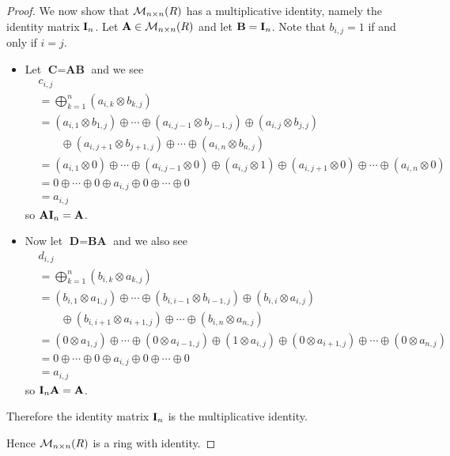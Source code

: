 \begin{proof}
    We now show that $\mathcal{M}_{n\times n}(R)$ has a multiplicative identity, namely the identity matrix $\textbf{I}_{n}$. Let $\textbf{A} \in \mathcal{M}_{n\times n}(R)$ and let $\textbf{B} = \textbf{I}_{n}$. Note that $b_{i,j} = 1$ if and only if $i = j$.
    \begin{itemize}
        \item Let $\textbf{C} = \textbf{AB}$ and we see
        \begin{align*}
            &c_{i,j}\\
            &= \bigoplus_{k=1}^n(a_{i,k}\otimes b_{k,j})\\
            &= (a_{i,1}\otimes b_{1,j}) \oplus \cdots \oplus (a_{i,j-1}\otimes b_{j-1,j}) \oplus (a_{i,j}\otimes b_{j,j})\\
            &\quad\quad\oplus (a_{i,{j+1}}\otimes b_{j+1,j}) \oplus \cdots \oplus (a_{i,n}\otimes b_{n,j})\\
            &= (a_{i,1}\otimes 0) \oplus \cdots \oplus (a_{i,{j-1}}\otimes 0)\oplus (a_{i,j}\otimes 1) \oplus (a_{i,{j+1}}\otimes 0) \oplus \cdots \oplus (a_{i,n}\otimes 0)\\
            &= 0 \oplus \cdots \oplus 0 \oplus a_{i,j} \oplus 0 \oplus \cdots \oplus 0\\
            &= a_{i,j}
        \end{align*}
        so $\textbf{A}\textbf{I}_{n} = \textbf{A}$.

        \item Now let $\textbf{D} = \textbf{BA}$ and we also see
        \begin{align*}
            &d_{i,j}\\
            &= \bigoplus_{k=1}^n(b_{i,k}\otimes a_{k,j})\\
            &= (b_{i,1}\otimes a_{1,j}) \oplus \cdots \oplus (b_{i,i-1}\otimes b_{i-1,j}) \oplus (b_{i,i}\otimes a_{i,j})\\
            &\quad\quad\oplus (b_{i,{i+1}}\otimes a_{i+1,j}) \oplus \cdots \oplus (b_{i,n}\otimes a_{n,j})\\
            &= (0 \otimes a_{1,j}) \oplus \cdots \oplus (0\otimes a_{i-1,j})\oplus (1\otimes a_{i,j}) \oplus (0\otimes a_{i+1,j}) \oplus \cdots \oplus (0\otimes a_{n,j})\\
            &= 0 \oplus \cdots \oplus 0 \oplus a_{i,j} \oplus 0 \oplus \cdots \oplus 0\\
            &= a_{i,j}
        \end{align*}
        so $\textbf{I}_{n}\textbf{A} = \textbf{A}$.
    \end{itemize}
    Therefore the identity matrix $\textbf{I}_{n}$ is the multiplicative identity.

    Hence $\mathcal{M}_{n\times n}(R)$ is a ring with identity.
\end{proof}

